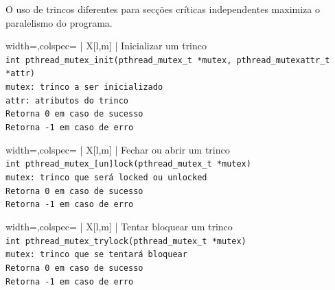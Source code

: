 \documentclass[11pt]{article}
\begin{document}
O uso de trincos diferentes para secções críticas independentes maximiza o paralelismo do programa.

\begin{tblr}{width=\linewidth,colspec={ | X[l,m] | }}
    \hline
    \centering Inicializar um trinco             \\\hline
    \lstinline|int pthread_mutex_init(pthread_mutex_t *mutex, pthread_mutexattr_t
    *attr)|                                      \\\hline
    \lstinline|mutex: trinco a ser inicializado| \\
    \lstinline|attr: atributos do trinco|        \\\hline
    \lstinline|Retorna 0 em caso de sucesso|     \\
    \lstinline|Retorna -1 em caso de erro|       \\\hline
\end{tblr}

\begin{tblr}{width=\linewidth,colspec={ | X[l,m] | }}
    \hline
    \centering Fechar ou abrir um trinco                           \\\hline
    \lstinline|int pthread_mutex_[un]lock(pthread_mutex_t *mutex)| \\\hline
    \lstinline|mutex: trinco que será locked ou unlocked|          \\\hline
    \lstinline|Retorna 0 em caso de sucesso|                       \\
    \lstinline|Retorna -1 em caso de erro|                         \\\hline
\end{tblr}

\begin{tblr}{width=\linewidth,colspec={ | X[l,m] | }}
    \hline
    \centering Tentar bloquear um trinco                          \\\hline
    \lstinline|int pthread_mutex_trylock(pthread_mutex_t *mutex)| \\\hline
    \lstinline|mutex: trinco que se tentará bloquear|             \\\hline
    \lstinline|Retorna 0 em caso de sucesso|                      \\
    \lstinline|Retorna -1 em caso de erro|                        \\\hline
\end{tblr}
\end{document}
